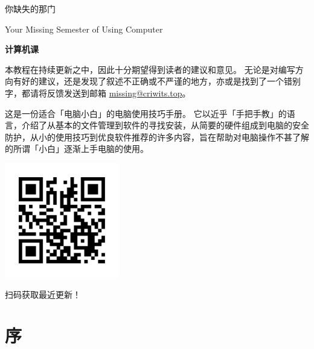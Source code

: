 \documentclass[a4paper,x11names]{book}
\date{\today}
\begin{document}
\maketitle

\frontmatter

\thispagestyle{empty}
\begin{center}
  \vspace*{2.5cm}
  \fontsize{42pt}{54pt}\selectfont{}\textsf{你缺失的那门}\par
  \fontsize{18pt}{18pt}\selectfont{}\textsf{Your Missing Semester of Using Computer}\par
  \fontsize{54pt}{8pt}\selectfont{}\textbf{\textsf{计算机课}}\par
  \vspace*{3.6cm}
\end{center}

\begin{note}
  本教程在持续更新之中，因此十分期望得到读者的建议和意见。
  无论是对编写方向有好的建议，还是发现了叙述不正确或不严谨的地方，亦或是找到了一个错别字，都请将反馈发送到邮箱 \href{mailto:missing@criwits.top}{missing@criwits.top}。
\end{note}

这是一份适合「电脑小白」的电脑使用技巧手册。
它以近乎「手把手教」的语言，介绍了从基本的文件管理到软件的寻找安装，从简要的硬件组成到电脑的安全防护，从小的使用技巧到优良软件推荐的许多内容，旨在帮助对电脑操作不甚了解的所谓「小白」逐渐上手电脑的使用。

\begin{center}
  \vspace*{1cm}
  \includegraphics[width=5cm]{src/QR_CODE.png}\par
  扫码获取最近更新！
\end{center}  

\renewcommand\thefootnote{\fnsymbol{footnote}}
\tableofcontents
\renewcommand\thefootnote{\arabic{footnote}}

\chapter{序}
\end{document}
